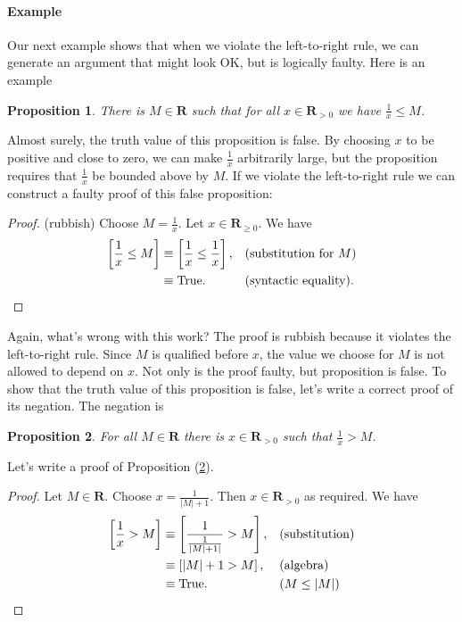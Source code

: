 \documentclass[12pt,fleqn]{article}
\newcommand{\reals}{\mathbf{R}}
\newcommand{\true}{\mathrm{True}}
\newenvironment{myproof}
  {\begin{shaded}\begin{proof}}
  {\end{proof}\end{shaded}}
\newtheorem{prop}{Proposition}
\newcounter{ex}\setcounter{ex}{0}
\newcommand{\ex}{%
\setcounter{ex}{\value{ex}+1}
\paragraph{Example \theex}}
\begin{document}
\ex Our next example  shows that when we violate the left-to-right rule, we can generate an  argument that might look OK, but 
is logically faulty.  Here is an example

\begin{prop} There is $M \in \reals$ such that for all $x \in \reals_{>0}$ we have  $\frac{1}{x} \leq M$.  
\end{prop}

Almost surely, the truth value of this proposition is false. By choosing $x$ to be positive and close to zero,  we can make $\frac{1}{x}$ 
arbitrarily large, but the proposition requires that  $\frac{1}{x}$   be bounded above by $M$. If we violate the left-to-right rule
we can construct a faulty proof of this false proposition:

\begin{myproof} (rubbish) Choose $M = \frac{1}{x}$. Let  $x \in \reals_{\geq 0}$. We have
\begin{align*}
 \left[\frac{1}{x}  \leq M  \right] &\equiv
 \left[\frac{1}{x}  \leq  \frac{1}{x}  \right],  &&\mbox{(substitution for $M$)} \\
 &\equiv \mbox{True}. &&\mbox{(syntactic equality)}.   \qedhere
\end{align*}
\end{myproof}
\noindent Again, what's wrong with this work?   The proof is rubbish because it violates  the left-to-right rule.  Since $M$ is qualified before $x$,
  the value we choose for $M$ is not allowed to depend on $x$. Not only is the proof faulty, but proposition is false.  To show that the 
  truth value of this proposition is false, let's write a correct proof of its negation.  The negation  is 

\begin{prop} For all $M \in \reals$  there is $x \in \reals_{>0}$ such that $\frac{1}{x} >  M$.  \label{px14} \end{prop}

Let's write a proof of  Proposition (\ref{px14}).

\begin{myproof} Let $M \in \reals$.  Choose $x  = \frac{1}{|M| + 1 }$. Then  $x \in \reals_{>0}$ as required.  We have
\begin{align*}
  \left [ \frac{1}{x} > M \right] &\equiv \left[  \frac{1}{\frac{1}{|M| + 1|} } > M   \right], &&\text{(substitution)} \\
                                                      &\equiv \left[|M| + 1 > M \right], &&\text{(algebra)} \\
                                                      &\equiv \true.  &&( M \leq |M|) \qedhere
\end{align*}
\end{myproof}                                   
\end{document}
